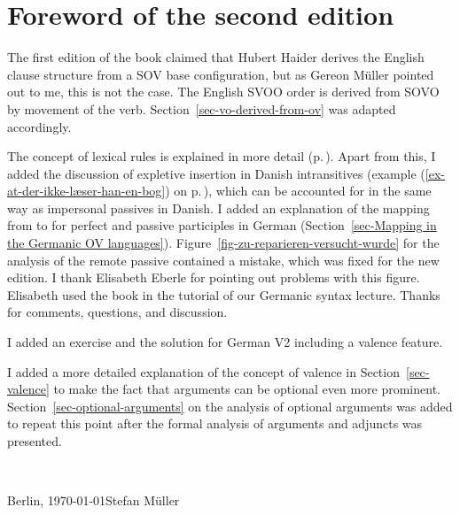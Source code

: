 \section*{Foreword of the second edition}



The first edition of the book claimed that Hubert Haider derives the English clause structure from a
SOV base configuration, but as Gereon Müller pointed out to me, this is not the case. The English
SVOO order is derived from SOVO by movement of the verb. Section~\ref{sec-vo-derived-from-ov} was
adapted accordingly.

The concept of lexical rules is explained in more detail
(p.\,\pageref{page-lexical-rule-explanation-start}). %
Apart from this, I added the discussion of expletive insertion in Danish intransitives (example (\ref{ex-at-der-ikke-læser-han-en-bog}) on
p.\,\pageref{ex-at-der-ikke-læser-han-en-bog}), which can be accounted for in the same way as
impersonal passives in Danish. I added an explanation of the mapping from \argst to \comps for
perfect and passive participles in German (Section~\ref{sec-Mapping in the Germanic OV
  languages}). Figure~\ref{fig-zu-reparieren-versucht-wurde} for the analysis of the remote passive contained a mistake, which was
fixed for the new edition. I thank Elisabeth Eberle for pointing out problems with this figure. Elisabeth used the book in the tutorial of our
Germanic syntax lecture. Thanks for comments, questions, and discussion.


I added an exercise and the solution for German V2 including a valence feature.




I added a more detailed explanation of the concept of valence in Section~\ref{sec-valence} to make the fact that arguments can be
optional even more prominent. Section~\ref{sec-optional-arguments} on the analysis of optional arguments was added to repeat
this point after the formal analysis of arguments and adjuncts was presented.






~\medskip

\noindent
Berlin, \today\hfill Stefan Müller

